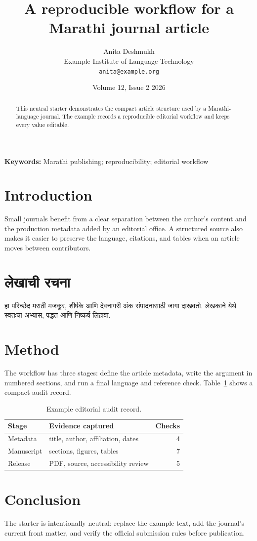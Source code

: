 \documentclass[12pt,a4paper]{article}
\title{A reproducible workflow for a Marathi journal article}
\author{Anita Deshmukh\\\small Example Institute of Language Technology\\\small\texttt{anita@example.org}}
\date{Volume 12, Issue 2 \textbullet{} 2026}
\begin{document}
\maketitle

\begin{abstract}
  This neutral starter demonstrates the compact article structure used by a
  Marathi-language journal. The example records a reproducible editorial
  workflow and keeps every value editable.
\end{abstract}
\textbf{Keywords:} Marathi publishing; reproducibility; editorial workflow

\section{Introduction}
Small journals benefit from a clear separation between the author's content
and the production metadata added by an editorial office. A structured source
also makes it easier to preserve the language, citations, and tables when an
article moves between contributors.

\section{लेखाची रचना}
हा परिच्छेद मराठी मजकूर, शीर्षके आणि देवनागरी अंक संपादनासाठी जागा दाखवतो.
लेखकाने येथे स्वतःचा अभ्यास, पद्धत आणि निष्कर्ष लिहावा.

\section{Method}
The workflow has three stages: define the article metadata, write the
argument in numbered sections, and run a final language and reference check.
Table~\ref{tab:stages} shows a compact audit record.

\begin{table}[ht]
  \centering
  \caption{Example editorial audit record.}
  \label{tab:stages}
  \begin{tabularx}{0.9\linewidth}{@{}lXr@{}}
    \toprule
    Stage & Evidence captured & Checks \\
    \midrule
    Metadata & title, author, affiliation, dates & 4 \\
    Manuscript & sections, figures, tables & 7 \\
    Release & PDF, source, accessibility review & 5 \\
    \bottomrule
  \end{tabularx}
\end{table}

\section{Conclusion}
The starter is intentionally neutral: replace the example text, add the
journal's current front matter, and verify the official submission rules
before publication.
\end{document}
